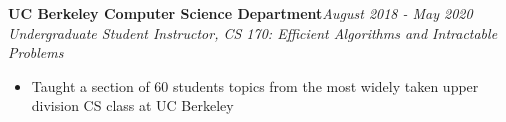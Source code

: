 \documentclass[letterpaper,8pt]{article}
\newcommand{\resitem}[1]{\item #1 \vspace{-1pt}}
\begin{document}
{\begin{itemize}
{%



    \item
	\textbf{UC Berkeley Computer Science Department}\hfill{\textit{August 2018 - May 2020}} \\
	\textit{Undergraduate Student Instructor, CS 170: Efficient Algorithms and Intractable Problems}
	\begin{itemize}[noitemsep,nolistsep]
		\resitem{\small{Taught a section of 60 students topics from the most widely taken upper division CS class at UC Berkeley}}
	\end{itemize}



}


\end{itemize}

}
\end{document}
